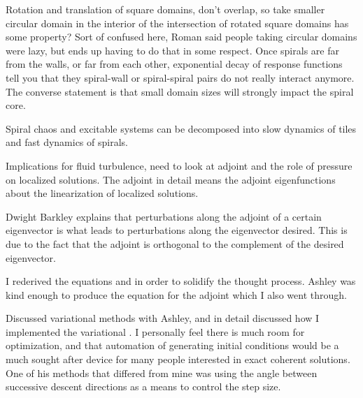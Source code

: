 \begin{description}
{\begin{description}
Rotation and translation of square domains, don't overlap, so take
smaller circular domain in the interior of the intersection of rotated
square domains has some property? Sort of confused here, Roman said people
taking circular domains were lazy, but ends up having to do that in some
respect.
Once spirals are far from the walls, or far from each other,
exponential decay of response
functions tell you that they spiral-wall or spiral-spiral
pairs do not really interact anymore. The converse statement is
that small domain sizes will strongly impact the spiral core.

Spiral chaos and excitable systems can be decomposed into slow
dynamics of tiles and fast dynamics of spirals.

Implications for fluid turbulence, need to look at adjoint
and the role of pressure on localized solutions. The adjoint in
detail means the adjoint eigenfunctions about the linearization
of localized solutions.

Dwight Barkley explains that perturbations along the adjoint
of a certain eigenvector is what leads to perturbations along
the eigenvector desired. This is due to the fact that the adjoint
is orthogonal to the complement of the desired eigenvector.

\item[Variational multishooting]
I rederived the equations  and 
in order to solidify the thought process. Ashley was kind enough to produce
the equation for the adjoint  which I also went through.

\item[A. Willis Coffee discussion]
Discussed variational methods with Ashley, and in detail discussed how I
implemented the variational {\descent}. I personally feel there is much
room for optimization, and that automation of generating initial conditions
would be a much sought after device for many people interested in exact
coherent solutions. One of his methods that differed from mine was using the
angle between successive descent directions as a means to control the step size.

\end{description}
}

\end{description}
